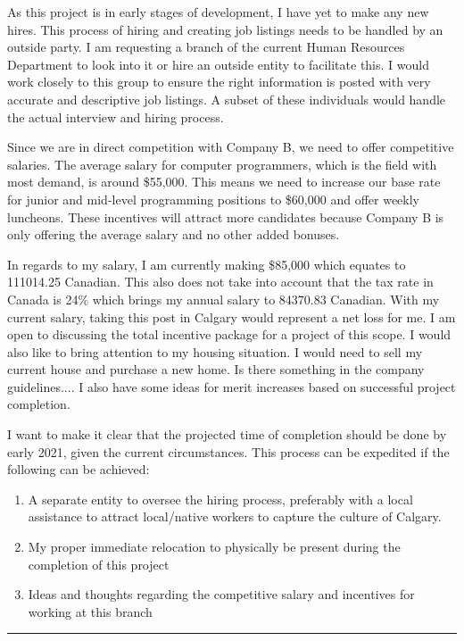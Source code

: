 \documentclass{article}
\begin{document}
As this project is in early stages of development, I have yet to make any new hires.
This process of hiring and creating job listings needs to be handled by an outside party.
I am requesting a branch of the current Human Resources Department to look into it or hire an outside entity to facilitate this.
I would work closely to this group to ensure the right information is posted with very accurate and descriptive job listings.
A subset of these individuals would handle the actual interview and hiring process.

Since we are in direct competition with Company B, we need to offer competitive salaries.
The average salary for computer programmers, which is the field with most demand, is around \$55,000.
This means we need to increase our base rate for junior and mid-level programming positions to \$60,000 and offer weekly luncheons.
These incentives will attract more candidates because Company B is only offering the average salary and no other added bonuses.

In regards to my salary, I am currently making \$85,000 which equates to 111014.25 Canadian.
This also does not take into account that the tax rate in Canada is 24\% which brings my annual salary to 84370.83 Canadian.
With my current salary, taking this post in Calgary would represent a net loss for me. I am open to discussing the total incentive package for a project of this scope.
I would also like to bring attention to my housing situation.
I would need to sell my current house and purchase a new home.
Is there something in the company guidelines....
I also have some ideas for merit increases based on successful project completion.


I want to make it clear that the projected time of completion should be done by early 2021, given the current circumstances.
This process can be expedited if the following can be achieved:

\begin{enumerate}
\item A separate entity to oversee the hiring process, preferably with a local assistance to attract local/native workers to capture the culture of Calgary.
\item My proper immediate relocation to physically be present during the completion of this project
\item Ideas and thoughts regarding the competitive salary and incentives for working at this branch

\end{enumerate}

\par\noindent\rule{\textwidth}{0.4pt}
\end{document}
